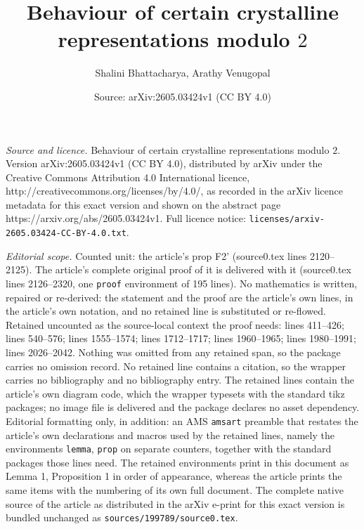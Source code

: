 \documentclass[10pt,a4paper]{amsart}
\title{Behaviour of certain crystalline representations modulo $2$}
\author{Shalini Bhattacharya, Arathy Venugopal}
\date{Source: arXiv:2605.03424v1 (CC BY 4.0)}
\begin{document}
\maketitle

\noindent\emph{Source and licence.} Behaviour of certain crystalline representations modulo $2$. Version arXiv:2605.03424v1 (CC BY 4.0), distributed by arXiv under the Creative Commons Attribution 4.0 International licence, http://creativecommons.org/licenses/by/4.0/, as recorded in the arXiv licence metadata for this exact version and shown on the abstract page https://arxiv.org/abs/2605.03424v1. Full licence notice: \texttt{licenses/arxiv-2605.03424-CC-BY-4.0.txt}.\par\smallskip

\noindent\textit{Editorial scope.} Counted unit: the article's prop F2' (source0.tex lines 2120--2125). The article's complete original proof of it is delivered with it (source0.tex lines 2126--2320, one \texttt{proof} environment of 195 lines). No mathematics is written, repaired or re-derived: the statement and the proof are the article's own lines, in the article's own notation, and no retained line is substituted or re-flowed.  Retained uncounted as the source-local context the proof needs: lines 411--426; lines 540--576; lines 1555--1574; lines 1712--1717; lines 1960--1965; lines 1980--1991; lines 2026--2042.  Nothing was omitted from any retained span, so the package carries no omission record.  No retained line contains a citation, so the wrapper carries no bibliography and no bibliography entry.  The retained lines contain the article's own diagram code, which the wrapper typesets with the standard tikz packages; no image file is delivered and the package declares no asset dependency.  Editorial formatting only, in addition: an AMS \texttt{amsart} preamble that restates the article's own declarations and macros used by the retained lines, namely the environments \texttt{lemma}, \texttt{prop} on separate counters, together with the standard packages those lines need.  The retained environments print in this document as Lemma 1, Proposition 1 in order of appearance, whereas the article prints the same items with the numbering of its own full document.  The complete native source of the article as distributed in the arXiv e-print for this exact version is bundled unchanged as \texttt{sources/199789/source0.tex}.
\end{document}
